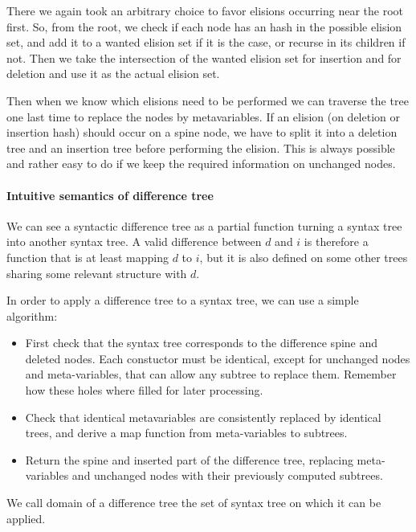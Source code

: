 \documentclass[a4paper,11pt]{article}
\begin{document}
There we again took an arbitrary choice to favor elisions occurring near the
root first. So, from the root, we check if each node has an hash in the
possible elision set, and add it to a wanted elision set if it is the case, or
recurse in its children if not. Then we take the intersection of the wanted
elision set for insertion and for deletion and use it as the actual elision set.

Then when we know which elisions need to be performed we can traverse the tree
one last time to replace the nodes by metavariables. If an elision (on
deletion or insertion hash) should occur on a spine node, we have to split it
into a deletion tree and an insertion tree before performing the elision. This
is always possible and rather easy to do if we keep the required information on
unchanged nodes.


\paragraph{Intuitive semantics of difference tree}
\label{sec:diff_application}

We can see a syntactic difference tree as a partial function turning a syntax
tree into another syntax tree. A valid difference between $d$ and $i$ is
therefore a function that is at least mapping $d$ to $i$, but it is
also defined on some other trees sharing some relevant structure with $d$.

In order to apply a difference tree to a syntax tree, we can use a simple
algorithm:
\begin{itemize}
 \item First check that the syntax tree corresponds to the difference spine and
deleted nodes. Each constuctor must be identical, except for unchanged nodes
and meta-variables, that can allow any subtree to replace them. Remember how
these holes where filled for later processing.
 \item Check that identical metavariables are consistently replaced by
identical trees, and derive a map function from meta-variables to subtrees.
 \item Return the spine and inserted part of the difference tree, replacing
meta-variables and unchanged nodes with their previously computed subtrees.
\end{itemize}

We call domain of a difference tree the set of syntax tree on which it can be
applied.
\end{document}
